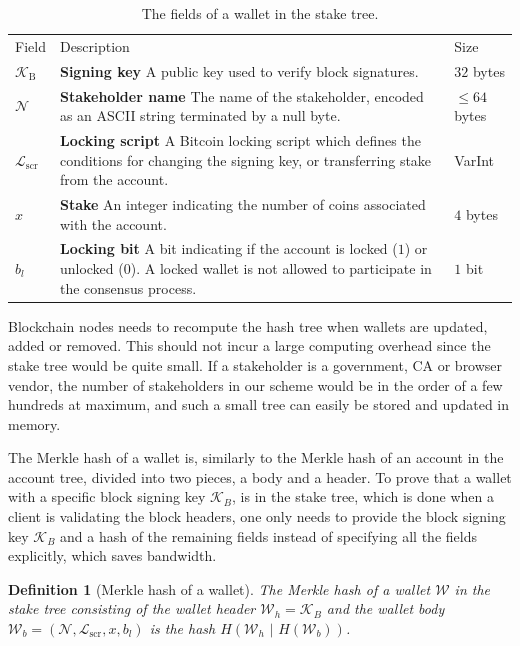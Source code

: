 \documentclass{style/kththesis}
\newtheorem{definition}{Definition}
\begin{document}
\begin{table}[ht]
\caption{The fields of a wallet in the stake tree.}
\label{tab:stake-fields}
\begin{tabularx}{\linewidth}{lXl}
\cmidrule(r){1-3}
Field & Description & Size \\
\cmidrule(r){1-3}
\rowcolor{Cornsilk} $\mathcal{K}_{\text{B}}$ & \textbf{Signing key} A public key used to verify block signatures. & $32$ bytes \\
$\mathcal{N}$ & \textbf{Stakeholder name} The name of the stakeholder, encoded as an ASCII string terminated by a null byte. & $\leq 64$ bytes \\
$\mathcal{L}_{\text{scr}}$ & \textbf{Locking script} A Bitcoin locking script which defines the conditions for changing the signing key, or transferring stake from the account. & VarInt \\
$x$ & \textbf{Stake} An integer indicating the number of coins associated with the account. & $4$ bytes \\
$b_l$ & \textbf{Locking bit} A bit indicating if the account is locked ($1$) or unlocked ($0$). A locked wallet is not allowed to participate in the consensus process. & $1$ bit
\end{tabularx}
\end{table}

Blockchain nodes needs to recompute the hash tree when wallets are updated, added or removed. This should not incur a large computing overhead since the stake tree would be quite small. If a stakeholder is a government, CA or browser vendor, the number of stakeholders in our scheme would be in the order of a few hundreds at maximum, and such a small tree can easily be stored and updated in memory.

The Merkle hash of a wallet is, similarly to the Merkle hash of an account in the account tree, divided into two pieces, a body and a header. To prove that a wallet with a specific block signing key $\mathcal{K}_B$, is in the stake tree, which is done when a client is validating the block headers, one only needs to provide the block signing key $\mathcal{K}_B$ and a hash of the remaining fields instead of specifying all the fields explicitly, which saves bandwidth.

\begin{definition}[Merkle hash of a wallet]
\label{def:stake-hash}
The Merkle hash of a wallet $\mathcal{W}$ in the stake tree consisting of the wallet header $\mathcal{W}_h = \mathcal{K}_B$ and the wallet body $\mathcal{W}_b = (\mathcal{N}, \mathcal{L}_{\text{scr}}, x, b_l)$ is the hash $H(\mathcal{W}_h\text{ | } H(\mathcal{W}_b))$.
\end{definition}
\end{document}
